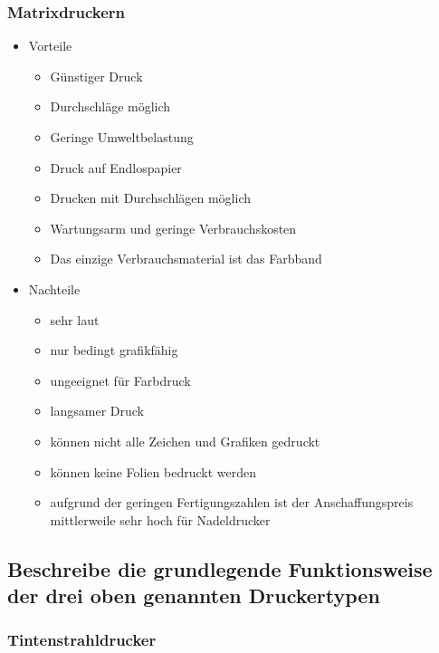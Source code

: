 \documentclass[a4paper]{article}
\begin{document}
    \subsubsection{\color{codegreen}Matrixdruckern}
    \begin{itemize}
        \color{red}
        \item Vorteile
        \begin{itemize}
            \color{blue}
            \item Günstiger Druck
            \item Durchschläge möglich
            \item Geringe Umweltbelastung
            \item Druck auf Endlospapier
            \item Drucken mit Durchschlägen möglich
            \item Wartungsarm und geringe Verbrauchskosten
            \item Das einzige Verbrauchsmaterial ist das Farbband
        \end{itemize}
        \item Nachteile
        \begin{itemize}
            \color{blue}
            \item sehr laut
            \item nur bedingt grafikfähig
            \item ungeeignet für Farbdruck
            \item langsamer Druck
            \item können nicht alle Zeichen und Grafiken gedruckt
            \item können keine Folien bedruckt werden
            \item aufgrund der geringen Fertigungszahlen ist  der Anschaffungspreis mittlerweile sehr hoch für Nadeldrucker
        \end{itemize}
    \end{itemize}
    \subsection{\color{red} Beschreibe die grundlegende Funktionsweise der drei oben genannten Druckertypen}\label{subsec:beschreibe-die-grundlegende-funktionsweise-der-drei-oben-genannten-druckertypen}
    \subsubsection{\color{codegreen}Tintenstrahldrucker}
\end{document}
